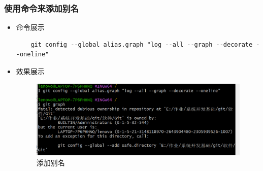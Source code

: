 \documentclass[UTF8]{ctexart}
\begin{document}
\subsubsection{使用命令来添加别名}
\begin{itemize}
  \item 命令展示
  \begin{verbatim}
    git config --global alias.graph "log --all --graph --decorate --oneline"

  \end{verbatim}

  \item 效果展示
  \begin{figure}[H]
    \centering
    \includegraphics[width=\textwidth]{n3} %
    \caption{添加别名}
    \label{fig:remote-branch-check}
  \end{figure}
\end{itemize}









\end{document}
